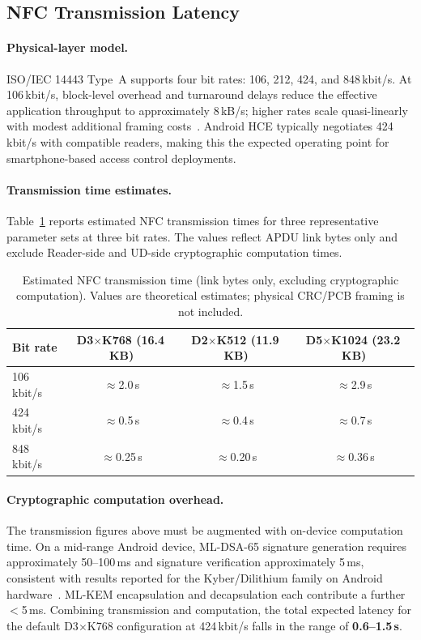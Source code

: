 \subsection{NFC Transmission Latency}
\label{sec:eval:latency}

\paragraph{Physical-layer model.}
ISO/IEC 14443 Type~A supports four bit rates: 106, 212, 424, and
848\,kbit/s.  At 106\,kbit/s, block-level overhead and turnaround delays
reduce the effective application throughput to approximately 8\,kB/s;
higher rates scale quasi-linearly with modest additional framing
costs~\cite{CSA:Aliro10}.  Android HCE typically negotiates 424\,kbit/s
with compatible readers, making this the expected operating point for
smartphone-based access control deployments.

\paragraph{Transmission time estimates.}
Table~\ref{tab:latency} reports estimated NFC transmission times for three
representative parameter sets at three bit rates.  The values reflect APDU
link bytes only and exclude Reader-side and UD-side cryptographic computation
times.

\begin{table}[t]
\centering
\caption{Estimated NFC transmission time (link bytes only, excluding
cryptographic computation).  Values are theoretical estimates; physical
CRC/PCB framing is not included.}
\label{tab:latency}
\begin{tabular}{lccc}
\hline
\textbf{Bit rate} & \textbf{D3$\times$K768 (16.4\,KB)} & \textbf{D2$\times$K512 (11.9\,KB)} & \textbf{D5$\times$K1024 (23.2\,KB)} \\
\hline
106\,kbit/s & $\approx$2.0\,s & $\approx$1.5\,s & $\approx$2.9\,s \\
424\,kbit/s & $\approx$0.5\,s & $\approx$0.4\,s & $\approx$0.7\,s \\
848\,kbit/s & $\approx$0.25\,s & $\approx$0.20\,s & $\approx$0.36\,s \\
\hline
\end{tabular}
\end{table}

\paragraph{Cryptographic computation overhead.}
The transmission figures above must be augmented with on-device computation
time.  On a mid-range Android device, ML-DSA-65 signature generation
requires approximately 50–100\,ms and signature verification approximately
5\,ms, consistent with results reported for the Kyber/Dilithium family on
Android hardware~\cite{NIST3PQC:Lima21}.  ML-KEM encapsulation and
decapsulation each contribute a further $<$5\,ms.  Combining transmission
and computation, the total expected latency for the default D3$\times$K768
configuration at 424\,kbit/s falls in the range of \textbf{0.6–1.5\,s}.

